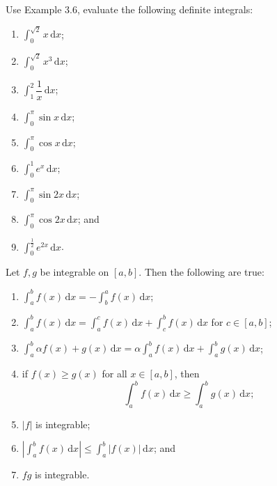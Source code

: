 \documentclass[11pt]{article}
\theoremstyle{break}
\theoremstyle{no_label}
\newcommand{\ddi}{\text{$\,$d}}
\numberwithin{equation}{theorem}
\begin{document}
\newpage

\begin{exercise}
    Use Example 3.6, evaluate the following definite integrals:\vspace{-1.8em}
    \begin{multicols}{3}
        \begin{enumerate}
            \item $\displaystyle\int_0^{\sqrt{2}} x\ddi x$;
            \item $\displaystyle\int_0^{\sqrt{2}} x^3\ddi x$;
            \item $\displaystyle\int_1^2 \dfrac{1}{x}\ddi x$;
            \item $\displaystyle\int_0^\pi \sin x\ddi x$;
            \item $\displaystyle\int_0^\pi \cos x\ddi x$;
            \item $\displaystyle\int_0^1 e^x\ddi x$;
            \item $\displaystyle\int_0^\pi \sin 2x\ddi x$;
            \item $\displaystyle\int_0^\pi \cos 2x\ddi x$; and
            \item $\displaystyle\int_0^{\frac{1}{2}} e^{2x}\ddi x$.
        \end{enumerate}
    \end{multicols}\vspace{0.1em}
\end{exercise}

\newpage

\begin{theorem}
    Let $f, g$ be integrable on $[a, b]$. Then the following are true:
    \begin{enumerate}
        \item $\displaystyle\int_a^b f(x)\ddi x=-\int_b^a f(x)\ddi x$;
        \item $\displaystyle\int_a^b f(x)\ddi x=\int_a^c f(x)\ddi x+\int_c^b f(x)\ddi x$ for $c\in[a, b]$;
        \item $\displaystyle\int_a^b \alpha f(x)+g(x)\ddi x=\alpha\int_a^b f(x)\ddi x+\int_a^b g(x)\ddi x$;
        \item if $f(x)\geq g(x)$ for all $x\in[a, b]$, then $$\int_a^b f(x)\ddi x\geq\int_a^b g(x)\ddi x;$$
        \item $|f|$ is integrable;
        \item $\displaystyle\left|\int_a^b f(x)\ddi x\right|\leq\int_a^b |f(x)|\ddi x$; and
        \item $fg$ is integrable.
    \end{enumerate}
\end{theorem}
\end{document}
